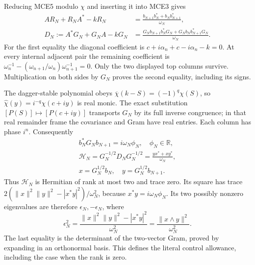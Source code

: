 \documentclass[11pt,a4paper]{article}
\begin{document}
Reducing MCE5 modulo $\chi$ and inserting it into MCE3 gives
\[
 \begin{aligned}
 AR_N+R_NA^*-kR_N
       &=\frac{b_{N+1}b_N^*+b_Nb_{N+1}^*}{\omega_N},\\
 D_N:=A^*G_N+G_NA-kG_N
       &=\frac{G_Nb_{N+1}b_N^*G_N+G_Nb_Nb_{N+1}^*G_N}{\omega_N}.
 \end{aligned}\tag{MCE6}
\]
For the first equality the diagonal coefficient is
$c+i\alpha_n+c-i\alpha_n-k=0$. At every internal adjacent
pair the remaining coefficient is
$\omega_n^{-1}-(\omega_{n+1}/\omega_n)\omega_{n+1}^{-1}=0$.
Only the two displayed top columns survive. Multiplication on both
sides by $G_N$ proves the second equality, including its signs.

The dagger-stable polynomial obeys
$\overline\chi(k-S)=(-1)^q\chi(S)$, so
$\widehat\chi(y)=i^{-q}\chi(c+iy)$ is real monic. The exact
substitution $[P(S)]\mapsto[P(c+iy)]$ transports $G_N$ by its
full inverse congruence; in that real remainder frame the covariance
and Gram have real entries. Each column has phase $i^n$.
Consequently
\[
 \begin{gathered}
 b_N^*G_Nb_{N+1}=i\omega_N\phi_N,\quad\phi_N\in\mathbb R,\\
 \mathcal H_N=G_N^{-1/2}D_NG_N^{-1/2}
        =\frac{yx^*+xy^*}{\omega_N},\\
 x=G_N^{1/2}b_N,\quad y=G_N^{1/2}b_{N+1}.
 \end{gathered}\tag{MCE7}
\]
Thus $\mathcal H_N$ is Hermitian of rank at most two and trace
zero. Its square has trace
$2(\|x\|^2\|y\|^2-|x^*y|^2)/\omega_N^2$, because
$x^*y=i\omega_N\phi_N$. Its two possibly nonzero eigenvalues
are therefore $\epsilon_N,-\epsilon_N$, where
\[
 \epsilon_N^2
   =\frac{\|x\|^2\|y\|^2-|x^*y|^2}{\omega_N^2}
   =\frac{\|x\wedge y\|^2}{\omega_N^2}.
 \tag{MCE8}
\]
The last equality is the determinant of the two-vector Gram,
proved by expanding in an orthonormal basis. This defines the
literal control allowance, including the case when the rank is zero.
\end{document}
